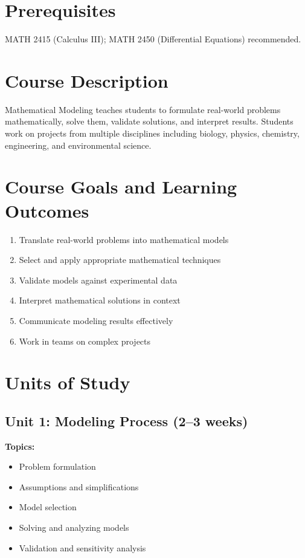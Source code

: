 \documentclass[12pt,oneside]{book}
\begin{document}
\section{Prerequisites}

MATH 2415 (Calculus III); MATH 2450 (Differential Equations) recommended.

\section{Course Description}

Mathematical Modeling teaches students to formulate real-world problems mathematically, solve them, validate solutions, and interpret results. Students work on projects from multiple disciplines including biology, physics, chemistry, engineering, and environmental science.

\section{Course Goals and Learning Outcomes}

\begin{enumerate}
    \item Translate real-world problems into mathematical models
    \item Select and apply appropriate mathematical techniques
    \item Validate models against experimental data
    \item Interpret mathematical solutions in context
    \item Communicate modeling results effectively
    \item Work in teams on complex projects
\end{enumerate}

\section{Units of Study}

\subsection{Unit 1: Modeling Process (2--3 weeks)}

\textbf{Topics:}
\begin{itemize}
    \item Problem formulation
    \item Assumptions and simplifications
    \item Model selection
    \item Solving and analyzing models
    \item Validation and sensitivity analysis
\end{itemize}
\end{document}
